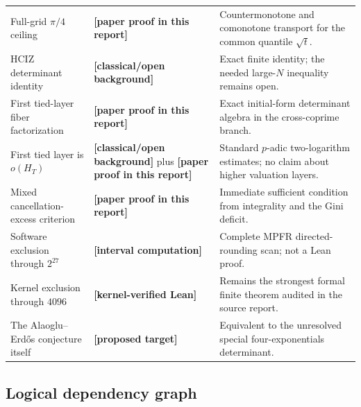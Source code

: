 \documentclass[11pt,oneside]{article}
\theoremstyle{definition}
\theoremstyle{remark}
\newcommand{\statuslean}{\textcolor{leanblue}{\textbf{[kernel-verified Lean]}}}
\newcommand{\statusnew}{\textcolor{newgreen}{\textbf{[paper proof in this report]}}}
\newcommand{\statuscomp}{\textcolor{computeviolet}{\textbf{[interval computation]}}}
\newcommand{\statusknown}{\textcolor{classicalgray}{\textbf{[classical/open background]}}}
\newcommand{\statusopen}{\textcolor{classicalgray}{\textbf{[proposed target]}}}
\begin{document}
\begin{longtable}{@{}>{\raggedright\arraybackslash}p{}>{\raggedright\arraybackslash}p{}>{\raggedright\arraybackslash}p{}@{}}
\addlinespace
Full-grid $\pi/4$ ceiling & \statusnew & Countermonotone and comonotone transport for the common quantile $\sqrt t$. \\
\addlinespace
HCIZ determinant identity & \statusknown & Exact finite identity; the needed large-$N$ inequality remains open. \\
\addlinespace
First tied-layer fiber factorization & \statusnew & Exact initial-form determinant algebra in the cross-coprime branch. \\
\addlinespace
First tied layer is $o(H_T)$ & \statusknown{} plus \statusnew & Standard $p$-adic two-logarithm estimates; no claim about higher valuation layers. \\
\addlinespace
Mixed cancellation-excess criterion & \statusnew & Immediate sufficient condition from integrality and the Gini deficit. \\
\addlinespace
Software exclusion through $2^{27}$ & \statuscomp & Complete MPFR directed-rounding scan; not a Lean proof. \\
\addlinespace
Kernel exclusion through $4096$ & \statuslean & Remains the strongest formal finite theorem audited in the source report. \\
\addlinespace
The Alaoglu--Erd\H{o}s conjecture itself & \statusopen & Equivalent to the unresolved special four-exponentials determinant. \\
\bottomrule
\end{longtable}

\subsection{Logical dependency graph}
\end{document}
